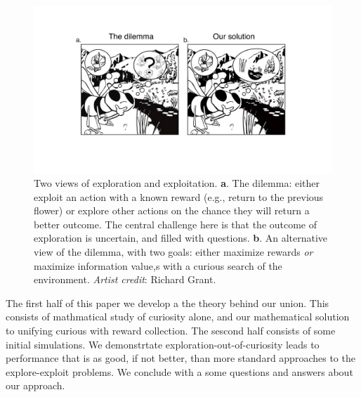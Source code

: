 \begin{figure}
	\begin{fullwidth}
	\includegraphics[width=.9\linewidth]{img/bee.pdf} 
	\caption{Two views of exploration and exploitation. \textbf{a}. The dilemma: either exploit an action with a known reward (e.g., return to the previous flower) or explore other actions on the chance they will return a better outcome. The central challenge here is that the outcome of exploration is uncertain, and filled with questions. \textbf{b}. An alternative view of the dilemma, with two goals: either maximize rewards \textit{or} maximize information value,s with a curious search of the environment. \textit{Artist credit}: Richard Grant.}
	\label{fig:bee} 
	\end{fullwidth}
\end{figure}

The first half of this paper we develop a the theory behind our union. This consists of mathmatical study of curiosity alone, and our mathematical solution to unifying curious with reward collection. The sescond half consists of some initial simulations. We demonstrtate exploration-out-of-curiosity leads to performance that is as good, if not better, than more standard approaches to the explore-exploit problems. We conclude with a some questions and answers about our approach.